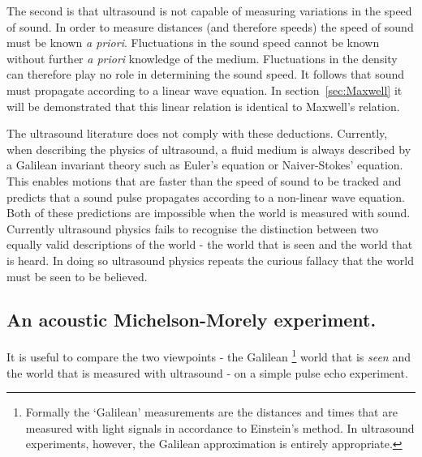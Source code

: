 \documentclass[10pt, fleqn,final,showtrims,oldfontcommands]{article} %
\newcommand{\secref}[1]{section~\ref{sec:#1}}
\begin{document}
The second is that ultrasound is not capable of  measuring variations in the speed of sound.
In order to measure distances (and therefore speeds) the speed of sound must be known {\em a priori}.
Fluctuations in the sound speed  cannot be known without further {\em a priori} knowledge of the medium. 
Fluctuations in the density  can therefore play no role in determining the sound speed. %
It follows that sound must propagate according to a linear wave equation. %
In \secref{Maxwell} it will be demonstrated that this linear relation is identical to Maxwell's relation.

The ultrasound literature does not comply with these deductions.
Currently, when describing the physics of ultrasound, a fluid medium is always described by a Galilean invariant theory such as Euler's equation or Naiver-Stokes' equation.
This enables motions that are faster than the speed of sound to be tracked 
and predicts that  a sound pulse  propagates according to  a non-linear wave equation.
Both of these predictions are impossible when the world is measured with sound.
%
Currently ultrasound physics fails to recognise the distinction between  two equally valid descriptions of the world -
the world that is seen
and the world that is heard.
In doing so ultrasound physics repeats the curious  fallacy that  the world must be seen to be believed.

\subsection{An acoustic Michelson-Morely  experiment.}

It is useful to compare the two viewpoints - the Galilean%
\footnote{Formally the `Galilean' measurements are the distances and times that are  measured with light signals in accordance to Einstein's method.
In ultrasound experiments, however, the Galilean approximation is entirely appropriate.}
 world that is {\em seen} 
and the world that is measured with ultrasound - on a simple pulse echo experiment.
%
\end{document}
